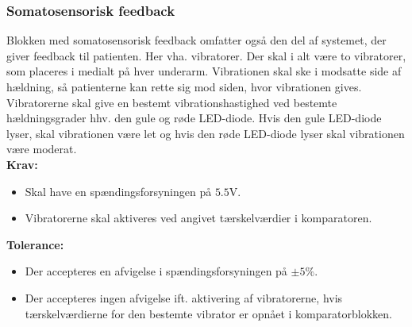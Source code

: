 \subsubsection{Somatosensorisk feedback} 
Blokken med somatosensorisk feedback omfatter også den del af systemet, der giver feedback til patienten. Her vha. vibratorer. Der skal i alt være to vibratorer, som placeres i medialt på hver underarm. Vibrationen skal ske i modsatte side af hældning, så patienterne kan rette sig mod siden, hvor vibrationen gives. Vibratorerne skal give en bestemt vibrationshastighed ved bestemte hældningsgrader hhv. den gule og røde LED-diode. Hvis den gule LED-diode lyser, skal vibrationen være let og hvis den røde LED-diode lyser skal vibrationen være moderat.
\\
\textbf{Krav:}
\begin{itemize}
	\item Skal have en spændingsforsyningen på $5.5$V.
	\item Vibratorerne skal aktiveres ved angivet tærskelværdier i komparatoren.
\end{itemize}
\textbf{Tolerance:}
\begin{itemize}
	\item Der accepteres en afvigelse i spændingsforsyningen på $\pm5\%$.
	\item Der accepteres ingen afvigelse ift. aktivering af vibratorerne, hvis tærskelværdierne for den bestemte vibrator er opnået i komparatorblokken.
\end{itemize}
